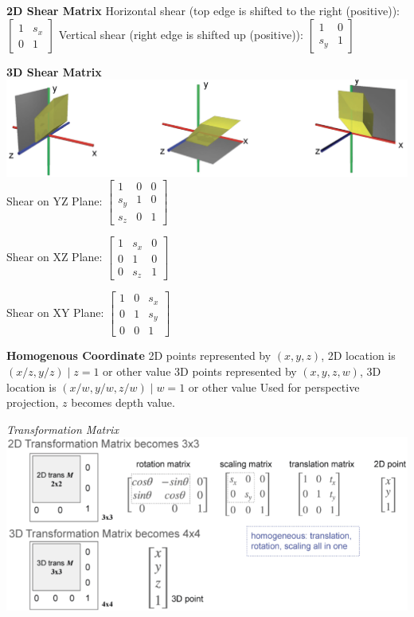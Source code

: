 \documentclass[letterpaper, 8pt]{extarticle}
\begin{document}
\begin{multicols*}{4}
\textbf{2D Shear Matrix}
Horizontal shear (top edge is shifted to the right (positive)):
\(
\begin{bmatrix}
    1 & s_x \\
    0 & 1
\end{bmatrix}
\)
Vertical shear (right edge is shifted up (positive)):
\(
\begin{bmatrix}
    1 & 0 \\
    s_y & 1
\end{bmatrix}
\)

\textbf{3D Shear Matrix}
\includegraphics[width=\linewidth]{3d-shear.png}
Shear on YZ Plane:
\(
\begin{bmatrix}
    1 & 0 & 0 \\
    s_y & 1 & 0 \\
    s_z & 0 & 1
\end{bmatrix}
\)

Shear on XZ Plane:
\(
\begin{bmatrix}
    1 & s_x & 0 \\
    0 & 1 & 0 \\
    0 & s_z & 1
\end{bmatrix}
\)

Shear on XY Plane:
\(
\begin{bmatrix}
    1 & 0 & s_x \\
    0 & 1 & s_y \\
    0 & 0 & 1
\end{bmatrix}
\)

\textbf{Homogenous Coordinate}
2D points represented by \((x, y, z)\), 2D location is \((x/z, y/z) \mid z=1\) or other value
3D points represented by \((x, y, z, w)\), 3D location is \((x/w, y/w, z/w) \mid w=1\) or other value
Used for perspective projection, \(z\) becomes depth value.

\textit{Transformation Matrix}
\includegraphics[width=\linewidth]{homogenous-coord-transformation-matrix.png}


\end{multicols*}
\end{document}
